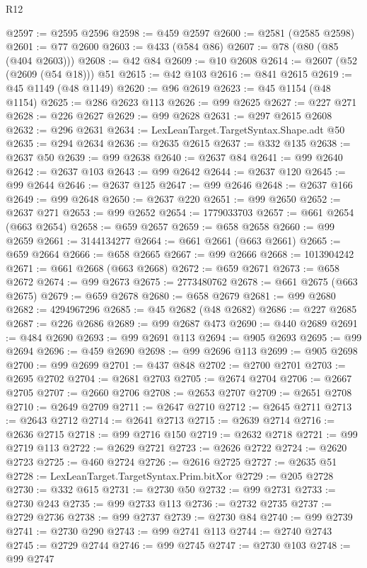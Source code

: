 \begin{lexlean}{R12}
\begin{coremodule}
@2597 := @2595 @2596
@2598 := @459 @2597
@2600 := @2581 (@2585 @2598)
@2601 := @77 @2600
@2603 := @433 (@584 @86)
@2607 := @78 (@80 (@85 (@404 @2603)))
@2608 := @42 @84
@2609 := @10 @2608
@2614 := @2607 (@52 (@2609 (@54 @18))) @51
@2615 := @42 @103
@2616 := @841 @2615
@2619 := @45 @1149 (@48 @1149)
@2620 := @96 @2619
@2623 := @45 @1154 (@48 @1154)
@2625 := @286 @2623 @113
@2626 := @99 @2625
@2627 := @227 @271
@2628 := @226 @2627
@2629 := @99 @2628
@2631 := @297 @2615 @2608
@2632 := @296 @2631
@2634 := LexLeanTarget.TargetSyntax.Shape.adt @50
@2635 := @294 @2634
@2636 := @2635 @2615
@2637 := @332 @135
@2638 := @2637 @50
@2639 := @99 @2638
@2640 := @2637 @84
@2641 := @99 @2640
@2642 := @2637 @103
@2643 := @99 @2642
@2644 := @2637 @120
@2645 := @99 @2644
@2646 := @2637 @125
@2647 := @99 @2646
@2648 := @2637 @166
@2649 := @99 @2648
@2650 := @2637 @220
@2651 := @99 @2650
@2652 := @2637 @271
@2653 := @99 @2652
@2654 := 1779033703
@2657 := @661 @2654 (@663 @2654)
@2658 := @659 @2657
@2659 := @658 @2658
@2660 := @99 @2659
@2661 := 3144134277
@2664 := @661 @2661 (@663 @2661)
@2665 := @659 @2664
@2666 := @658 @2665
@2667 := @99 @2666
@2668 := 1013904242
@2671 := @661 @2668 (@663 @2668)
@2672 := @659 @2671
@2673 := @658 @2672
@2674 := @99 @2673
@2675 := 2773480762
@2678 := @661 @2675 (@663 @2675)
@2679 := @659 @2678
@2680 := @658 @2679
@2681 := @99 @2680
@2682 := 4294967296
@2685 := @45 @2682 (@48 @2682)
@2686 := @227 @2685
@2687 := @226 @2686
@2689 := @99 @2687 @473
@2690 := @440 @2689
@2691 := @484 @2690
@2693 := @99 @2691 @113
@2694 := @905 @2693
@2695 := @99 @2694
@2696 := @459 @2690
@2698 := @99 @2696 @113
@2699 := @905 @2698
@2700 := @99 @2699
@2701 := @437 @848
@2702 := @2700 @2701
@2703 := @2695 @2702
@2704 := @2681 @2703
@2705 := @2674 @2704
@2706 := @2667 @2705
@2707 := @2660 @2706
@2708 := @2653 @2707
@2709 := @2651 @2708
@2710 := @2649 @2709
@2711 := @2647 @2710
@2712 := @2645 @2711
@2713 := @2643 @2712
@2714 := @2641 @2713
@2715 := @2639 @2714
@2716 := @2636 @2715
@2718 := @99 @2716 @150
@2719 := @2632 @2718
@2721 := @99 @2719 @113
@2722 := @2629 @2721
@2723 := @2626 @2722
@2724 := @2620 @2723
@2725 := @460 @2724
@2726 := @2616 @2725
@2727 := @2635 @51
@2728 := LexLeanTarget.TargetSyntax.Prim.bitXor
@2729 := @205 @2728
@2730 := @332 @615
@2731 := @2730 @50
@2732 := @99 @2731
@2733 := @2730 @243
@2735 := @99 @2733 @113
@2736 := @2732 @2735
@2737 := @2729 @2736
@2738 := @99 @2737
@2739 := @2730 @84
@2740 := @99 @2739
@2741 := @2730 @290
@2743 := @99 @2741 @113
@2744 := @2740 @2743
@2745 := @2729 @2744
@2746 := @99 @2745
@2747 := @2730 @103
@2748 := @99 @2747

\end{coremodule}
\end{lexlean}
